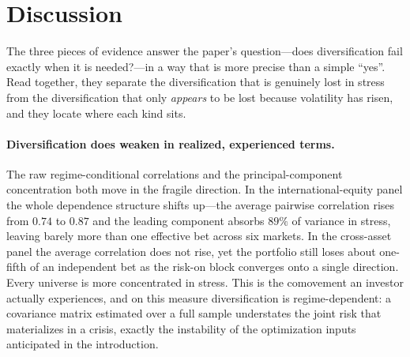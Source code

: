 
\section{Discussion}
\label{sec:discussion}

The three pieces of evidence answer the paper's question---does diversification fail exactly when it is needed?---in a way that is more precise than a simple ``yes''. Read together, they separate the diversification that is genuinely lost in stress from the diversification that only \emph{appears} to be lost because volatility has risen, and they locate where each kind sits.

\paragraph{Diversification does weaken in realized, experienced terms.} The raw regime-conditional correlations and the principal-component concentration both move in the fragile direction. In the international-equity panel the whole dependence structure shifts up---the average pairwise correlation rises from $0.74$ to $0.87$ and the leading component absorbs $89\%$ of variance in stress, leaving barely more than one effective bet across six markets. In the cross-asset panel the average correlation does not rise, yet the portfolio still loses about one-fifth of an independent bet as the risk-on block converges onto a single direction. Every universe is more concentrated in stress. This is the comovement an investor actually experiences, and on this measure diversification is regime-dependent: a covariance matrix estimated over a full sample understates the joint risk that materializes in a crisis, exactly the instability of the optimization inputs anticipated in the introduction.

